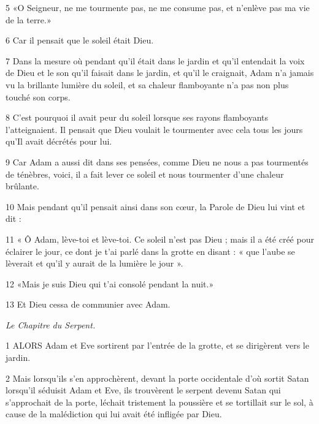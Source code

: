 \par 5 «O Seigneur, ne me tourmente pas, ne me consume pas, et n'enlève pas ma vie de la terre.»

\par 6 Car il pensait que le soleil était Dieu.

\par 7 Dans la mesure où pendant qu'il était dans le jardin et qu'il entendait la voix de Dieu et le son qu'il faisait dans le jardin, et qu'il le craignait, Adam n'a jamais vu la brillante lumière du soleil, et sa chaleur flamboyante n'a pas non plus touché son corps.

\par 8 C'est pourquoi il avait peur du soleil lorsque ses rayons flamboyants l'atteignaient. Il pensait que Dieu voulait le tourmenter avec cela tous les jours qu'Il avait décrétés pour lui.

\par 9 Car Adam a aussi dit dans ses pensées, comme Dieu ne nous a pas tourmentés de ténèbres, voici, il a fait lever ce soleil et nous tourmenter d'une chaleur brûlante.

\par 10 Mais pendant qu'il pensait ainsi dans son cœur, la Parole de Dieu lui vint et dit :

\par 11 « Ô Adam, lève-toi et lève-toi. Ce soleil n'est pas Dieu ; mais il a été créé pour éclairer le jour, ce dont je t'ai parlé dans la grotte en disant : « que l'aube se lèverait et qu'il y aurait de la lumière le jour ».

\par 12 «Mais je suis Dieu qui t'ai consolé pendant la nuit.»

\par 13 Et Dieu cessa de communier avec Adam.




\par \textit{Le Chapitre du Serpent.}

\par 1 ALORS Adam et Eve sortirent par l'entrée de la grotte, et se dirigèrent vers le jardin.

\par 2 Mais lorsqu'ils s'en approchèrent, devant la porte occidentale d'où sortit Satan lorsqu'il séduisit Adam et Eve, ils trouvèrent le serpent devenu Satan qui s'approchait de la porte, léchait tristement la poussière et se tortillait sur le sol, à cause de la malédiction qui lui avait été infligée par Dieu.


